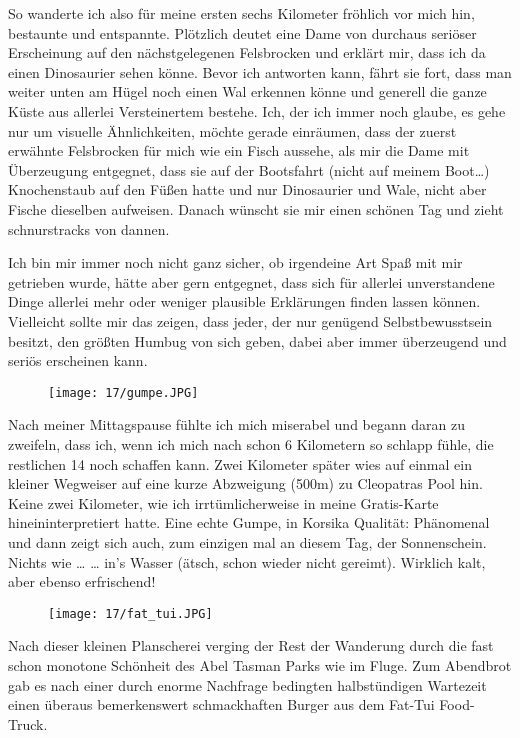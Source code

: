So wanderte ich also für meine ersten sechs Kilometer fröhlich vor
mich hin, bestaunte und entspannte. Plötzlich deutet eine Dame von
durchaus seriöser Erscheinung auf den nächstgelegenen Felsbrocken und
erklärt mir, dass ich da einen Dinosaurier sehen könne. Bevor ich
antworten kann, fährt sie fort, dass man weiter unten am Hügel noch
einen Wal erkennen könne und generell die ganze Küste aus allerlei
Versteinertem bestehe. Ich, der ich immer noch glaube, es gehe nur um
visuelle Ähnlichkeiten, möchte gerade einräumen, dass der zuerst
erwähnte Felsbrocken für mich wie ein Fisch aussehe, als mir die Dame
mit Überzeugung entgegnet, dass sie auf der Bootsfahrt (nicht auf
meinem Boot\ldots) Knochenstaub auf den Füßen hatte und nur
Dinosaurier und Wale, nicht aber Fische dieselben aufweisen.
Danach wünscht sie mir einen schönen Tag und zieht schnurstracks von
dannen.

Ich bin mir immer noch nicht ganz sicher, ob irgendeine Art Spaß mit
mir getrieben wurde, hätte aber gern entgegnet, dass sich für allerlei
unverstandene Dinge allerlei mehr oder weniger plausible Erklärungen
finden lassen können. Vielleicht sollte mir das zeigen, dass jeder,
der nur genügend Selbstbewusstsein besitzt, den größten Humbug von
sich geben, dabei aber immer überzeugend und seriös erscheinen kann.

\begin{figure}[h]
  \centering
  \texttt{[image: 17/gumpe.JPG]}
\end{figure}
Nach meiner Mittagspause fühlte ich mich miserabel und begann daran zu
zweifeln, dass ich, wenn ich mich nach schon 6 Kilometern so schlapp
fühle, die restlichen 14 noch schaffen kann. Zwei Kilometer später wies
auf einmal ein kleiner Wegweiser auf eine kurze Abzweigung (500m) zu
Cleopatras Pool hin. Keine zwei Kilometer, wie ich irrtümlicherweise in
meine Gratis-Karte hineininterpretiert hatte. Eine echte Gumpe, in
Korsika Qualität: Phänomenal und dann zeigt sich auch, zum einzigen mal
an diesem Tag, der Sonnenschein. Nichts wie \ldots{} \ldots{} in's
Wasser (ätsch, schon wieder nicht gereimt). Wirklich kalt, aber ebenso
erfrischend!

\begin{figure}[h]
  \centering
  \texttt{[image: 17/fat\_tui.JPG]}
\end{figure}
Nach dieser kleinen Planscherei verging der Rest der Wanderung durch
die fast schon monotone Schönheit des Abel Tasman Parks wie im
Fluge. Zum Abendbrot gab es nach einer durch enorme Nachfrage
bedingten halbstündigen Wartezeit einen überaus bemerkenswert
schmackhaften Burger aus dem Fat-Tui Food-Truck.

